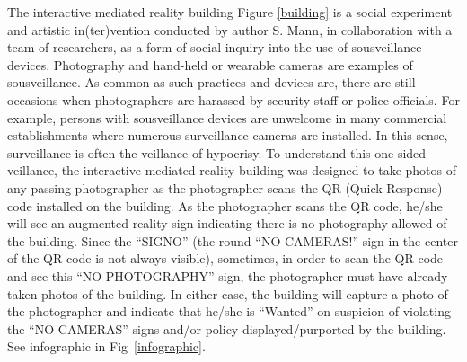 The interactive mediated reality building Figure \ref{building} is a social
experiment and artistic in(ter)vention conducted by author S. Mann,
in collaboration with a team of researchers,
as a form of social inquiry into the use of sousveillance devices.
Photography and hand-held or wearable cameras are examples of sousveillance.
As common as such practices and devices are, there are still occasions when
photographers are harassed by security staff or police officials.
For example, persons with sousveillance devices are unwelcome in many
commercial establishments where numerous surveillance cameras are installed.
In this sense, surveillance is often the veillance of hypocrisy.
To understand this one-sided veillance, the interactive mediated reality
building was designed to take photos of any passing photographer as the
photographer scans the QR (Quick Response) code installed on the building.
As the photographer scans the QR code, he/she will see an augmented reality
sign indicating there is no photography allowed of the building.
Since the ``SIGNO'' (the round ``NO CAMERAS!'' sign in the center of the QR
code is not always visible), sometimes,
in order to scan the QR code and see this ``NO PHOTOGRAPHY'' sign,
the photographer must have already taken photos of the building. In either
case, the building will capture a photo of the photographer
and indicate that he/she is ``Wanted'' on suspicion of
violating the ``NO CAMERAS'' signs and/or policy displayed/purported
by the building. 
See infographic in Fig~\ref{infographic}.
